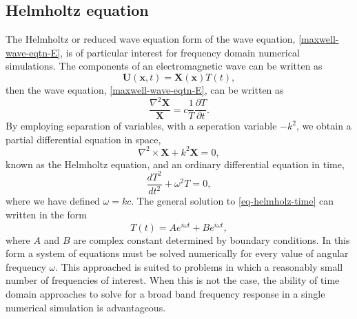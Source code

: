 \subsection{Helmholtz equation}

The Helmholtz or reduced wave equation form of the wave equation, \ref{maxwell-wave-eqtn-E}, is of particular interest for frequency domain numerical simulations. The components of an electromagnetic wave can be written as
$$
\mathbf{U}(\mathbf{x},t) = \mathbf{X}(\mathbf{x}) T(t),
$$
then the wave equation, \ref{maxwell-wave-eqtn-E}, can be written as
\begin{equation}
\label{eq:helmholz-space}
\frac{\nabla^2 \mathbf{X}}{\mathbf{X}} = c \frac{1}{T} \frac{\partial T}{\partial t } .
\end{equation}
By employing separation of variables, with a seperation variable $-k^2$, we obtain a partial differential equation in space,
\begin{equation}
\nabla^2 \times \mathbf{X} + k^2 \mathbf{X} = 0 ,
\label{eq-helmholz-time}
\end{equation}
known as the Helmholtz equation, and an ordinary differential equation in time,
\begin{equation}
\frac{d T ^2}{d t ^2} + \omega ^2 T  = 0 ,
\label{eq-helmholz-time}
\end{equation}
where we have defined $\omega = k c$. The general solution to \ref{eq-helmholz-time} can written in the form
\begin{equation}
\label{eq:helmholtz-time-soltn}
T(t) = A e^{i \omega t} + B e^{i \omega t},
\end{equation}
where $A$ and $B$ are complex constant determined by boundary conditions. In this form a system of equations must be solved numerically for every value of angular frequency $\omega$. This approached is suited to problems in which a reasonably small number of frequencies of interest. When this is not the case, the ability of time domain approaches to solve for a broad band frequency response in a single numerical simulation is advantageous.

